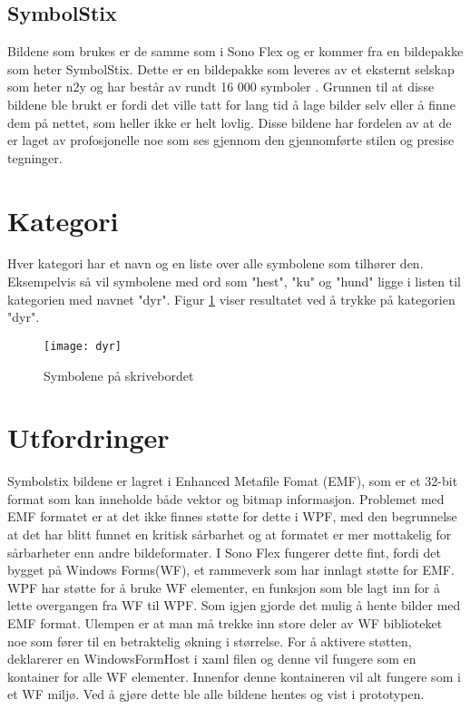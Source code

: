 \subsection{SymbolStix}

Bildene som brukes er de samme som i Sono Flex og er kommer fra en bildepakke som heter SymbolStix. Dette er en bildepakke som leveres av et eksternt selskap som heter n2y og har består av rundt 16 000 symboler \cite{n2y}. Grunnen til at disse bildene ble brukt er fordi det ville tatt for lang tid å lage bilder selv eller å finne dem på nettet, som heller ikke er helt lovlig. Disse bildene har fordelen av at de er laget av profosjonelle noe som ses gjennom den gjennomførte stilen og presise tegninger.


\section{Kategori}

Hver kategori har et navn og en liste over alle symbolene som tilhører den. Eksempelvis så vil symbolene med ord som "hest", "ku" og "hund" ligge i listen til kategorien med navnet "dyr". Figur \ref{fig:katego} viser resultatet ved å trykke på kategorien "dyr". 

\begin{figure}[ht!] 
\centering 
\texttt{[image: dyr]} 
\caption{Symbolene på skrivebordet} 
\label{fig:katego} 
\end{figure} 




 
 
\section{Utfordringer}

 
Symbolstix bildene er lagret i Enhanced Metafile Fomat (EMF), som er et 32-bit format som kan inneholde både vektor og bitmap informasjon\cite{AboutEMF}. Problemet med EMF formatet er at det ikke finnes støtte for dette i WPF, med den begrunnelse at det har blitt funnet en kritisk sårbarhet\cite{EMFVulnerability} og at formatet er mer mottakelig for sårbarheter\cite{EMFForum} enn andre bildeformater. I Sono Flex fungerer dette fint, fordi det bygget på Windows Forms(WF),  et rammeverk som har innlagt støtte for EMF. WPF har støtte for å bruke WF elementer,  en funksjon som ble lagt inn for å lette overgangen fra WF til WPF. Som igjen gjorde det mulig å hente bilder med EMF format. Ulempen er at man må trekke inn store deler av WF biblioteket noe som fører til en betraktelig økning i størrelse. For å aktivere støtten, deklarerer en WindowsFormHost i xaml filen og denne vil fungere som en kontainer for alle WF elementer. Innenfor denne kontaineren vil alt fungere som i et WF miljø. Ved å gjøre dette ble alle bildene hentes og vist i prototypen.  
 

